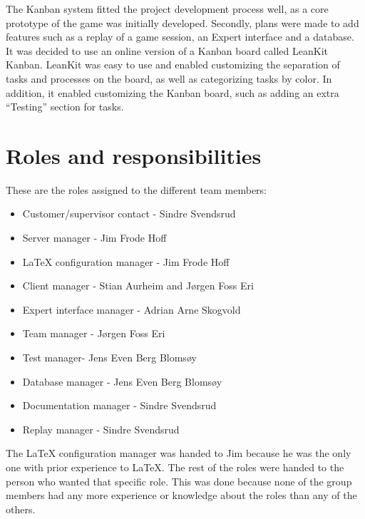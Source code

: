 The Kanban system fitted the project development process well, as a core 
prototype of the game was initially developed. Secondly, plans were made to 
add features such as a replay of a game session, an Expert interface and a 
database. It was decided to use an online version of a Kanban board called 
LeanKit Kanban. LeanKit was easy to use and enabled customizing the separation 
of tasks and processes on the board, as well as categorizing tasks by color. 
In addition, it enabled customizing the Kanban board, such as adding an extra 
“Testing” section for tasks.




\section{Roles and responsibilities}
These are the roles assigned to the different team members:

\begin{itemize} \setlength{\itemsep}{0cm}\setlength{\parskip}{0cm}
	\item Customer/supervisor contact - Sindre Svendsrud
	\item Server manager - Jim Frode Hoff
	\item LaTeX configuration manager - Jim Frode Hoff
	\item Client manager - Stian Aurheim and Jørgen Foss Eri
	\item Expert interface manager - Adrian Arne Skogvold
	\item Team manager - Jørgen Foss Eri
	\item Test manager- Jens Even Berg Blomsøy
	\item Database manager - Jens Even Berg Blomsøy
	\item Documentation manager - Sindre Svendsrud
	\item Replay manager - Sindre Svendsrud
\end{itemize}

The LaTeX configuration manager was handed to Jim because he was the only one with prior experience to LaTeX. The rest of the roles were handed to the person who wanted that specific role. This was done because none of the group members had any more experience or knowledge about the roles than any of the others.
\\\newline

